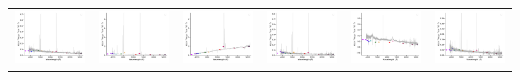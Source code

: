\begin{center}
\begin{longtable}{l l l l l l }
    \includegraphics[width=0.3\linewidth, clip]{Figs/Figs-sdss/spec-0409-51871-0596-STRIPE82-0062-010774.pdf} & \includegraphics[width=0.3\linewidth, clip]{Figs/Figs-sdss/spec-0410-51877-0217-STRIPE82-0063-024542.pdf} & \includegraphics[width=0.3\linewidth, clip]{Figs/Figs-sdss/spec-0410-51877-0492-STRIPE82-0064-042346.pdf} & \includegraphics[width=0.3\linewidth, clip]{Figs/Figs-sdss/spec-0410-51877-0519-STRIPE82-0064-031755.pdf} & \includegraphics[width=0.3\linewidth, clip]{Figs/Figs-sdss/spec-0410-51877-0527-STRIPE82-0064-069216.pdf} & \includegraphics[width=0.3\linewidth, clip]{Figs/Figs-sdss/spec-0501-52235-0474-SPLUS-n03n01-003922.pdf} \\

\end{longtable}
\end{center}

